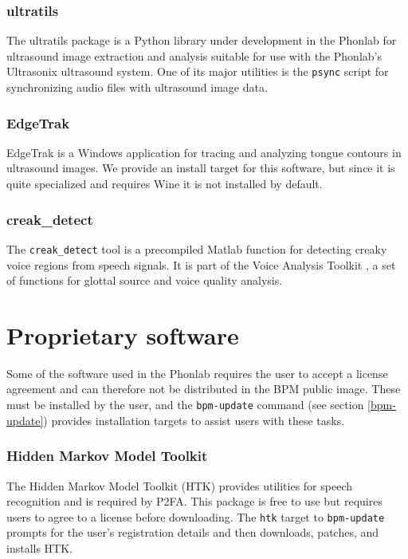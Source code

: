 \documentclass[a4paper]{article}
\begin{document}
      \subsubsection{ultratils}
      The ultratils package \cite{ultratils} is a Python library under development in the Phonlab for ultrasound image extraction and analysis suitable for use with the Phonlab's Ultrasonix ultrasound system. One of its major utilities is the {\tt psync} script for synchronizing audio files with ultrasound image data.

      \subsubsection{EdgeTrak} \label{sec:edgetrak}
      EdgeTrak is a Windows application for tracing and analyzing tongue contours in ultrasound images. We provide an install target for this software, but since it is quite specialized and requires Wine it is not installed by default.

      \subsubsection{creak\_detect}
      The {\tt creak\_detect} tool is a precompiled Matlab function for detecting creaky voice regions from speech signals. It is part of the Voice Analysis Toolkit \cite{voice-analysis-toolkit}, a set of functions for glottal source and voice quality analysis.
      

  \section{Proprietary software}
      Some of the software used in the Phonlab requires the user to accept a license agreement and can therefore not be distributed in the BPM public image.  These must be installed by the user, and the {\tt bpm-update} command (see section \ref{bpm-update}) provides installation targets to assist users with these tasks.

      \subsubsection{Hidden Markov Model Toolkit} \label{sec:htk}
      The Hidden Markov Model Toolkit (HTK) \cite{htk} provides utilities for speech recognition and is required by P2FA. This package is free to use but requires users to agree to a license before downloading. The {\tt htk} target to {\tt bpm-update} prompts for the user's registration details and then downloads, patches, and installs HTK.
\end{document}
